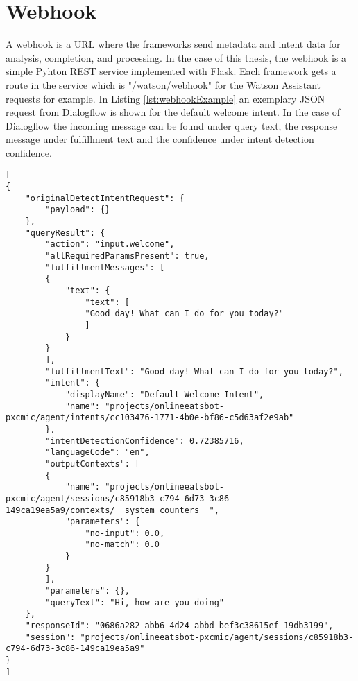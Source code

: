 \section{Webhook} \label{sec:webhook}
A webhook is a URL where the frameworks send metadata and intent data for analysis, completion, and processing.
In the case of this thesis, the webhook is a simple Pyhton REST service implemented with Flask.
Each framework gets a route in the service which is "/watson/webhook" for the Watson Assistant requests for example.
In Listing \ref{lst:webhookExample} an exemplary JSON request from Dialogflow is shown for the default welcome intent.
In the case of Dialogflow the incoming message can be found under query text, the response message under fulfillment text and the confidence under intent detection confidence. 
\begin{lstlisting}[caption={Dialogflow Webhook Request Example}, label={lst:webhookExample},captionpos=b,frame=single,language={[Sharp]C},commentstyle=\color{mygreen},keywordstyle=\color{blue},
morekeywords={}]                
[
{
    "originalDetectIntentRequest": {
        "payload": {}
    },
    "queryResult": {
        "action": "input.welcome",
        "allRequiredParamsPresent": true,
        "fulfillmentMessages": [
        {
            "text": {
                "text": [
                "Good day! What can I do for you today?"
                ]
            }
        }
        ],
        "fulfillmentText": "Good day! What can I do for you today?",
        "intent": {
            "displayName": "Default Welcome Intent",
            "name": "projects/onlineeatsbot-pxcmic/agent/intents/cc103476-1771-4b0e-bf86-c5d63af2e9ab"
        },
        "intentDetectionConfidence": 0.72385716,
        "languageCode": "en",
        "outputContexts": [
        {
            "name": "projects/onlineeatsbot-pxcmic/agent/sessions/c85918b3-c794-6d73-3c86-149ca19ea5a9/contexts/__system_counters__",
            "parameters": {
                "no-input": 0.0,
                "no-match": 0.0
            }
        }
        ],
        "parameters": {},
        "queryText": "Hi, how are you doing"
    },
    "responseId": "0686a282-abb6-4d24-abbd-bef3c38615ef-19db3199",
    "session": "projects/onlineeatsbot-pxcmic/agent/sessions/c85918b3-c794-6d73-3c86-149ca19ea5a9"
}
]\end{lstlisting}  

